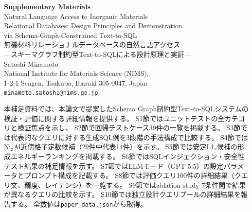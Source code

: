 \documentclass[5p,twocolumn]{elsarticle}
\begin{document}
\clearpage
\onecolumn
\appendix
\renewcommand{\thesection}{S\arabic{section}}
\renewcommand{\thetable}{S\arabic{table}}
\renewcommand{\thefigure}{S\arabic{figure}}
\renewcommand{\theequation}{S\arabic{equation}}
\setcounter{section}{0}
\setcounter{table}{0}
\setcounter{figure}{0}
\setcounter{equation}{0}

\begin{center}
  {\LARGE\bfseries Supplementary Materials}\\[0.8em]
  {\large Natural Language Access to Inorganic Materials\\
  Relational Databases: Design Principles and Demonstration\\
  via Schema-Graph-Constrained Text-to-SQL}\\[0.5em]
  {\large 無機材料リレーショナルデータベースの自然言語アクセス\\
  ---スキーマグラフ制約型Text-to-SQLによる設計原理と実証---}\\[1.0em]
  {\normalsize Satoshi Minamoto}\\[0.3em]
  {\small National Institute for Materials Science (NIMS),\\
  1-2-1 Sengen, Tsukuba, Ibaraki 305-0047, Japan}\\[0.3em]
  {\small \texttt{minamoto.satoshi@nims.go.jp}}
\end{center}
\vspace{1.0em}
\noindent\hrulefill
\vspace{1.0em}

\noindent
本補足資料では、本論文で提案したSchema Graph制約型Text-to-SQLシステムの
検証・評価に関する詳細情報を提供する。
S1節ではユニットテストの全カテゴリと検証焦点を示し、
S2節で回帰テストケース39件の一覧を掲載する。
S3節では代表的なクエリに対する生成SQL例を3段階の手法構成で比較する。
S4節ではNi$_3$Al近傍格子定数候補（29件中代表14件）を示す。
S5節では安定L1$_2$候補の形成エネルギーランキングを掲載する。
S6節ではSQLインジェクション・安全性テスト結果の補足情報を示す。
S7節ではLLMモード（GPT-5.5）の設定パラメータとプロンプト構成を記載する。
S8節では評価クエリ100件の詳細結果（クエリ文、精度、レイテンシ）を一覧する。
S9節ではablation study 7条件間で結果が異なるクエリの比較を示す。
S10節では独立設計クエリプールの詳細結果を報告する。
全数値は\texttt{paper\_data.json}から取得。

\end{document}
